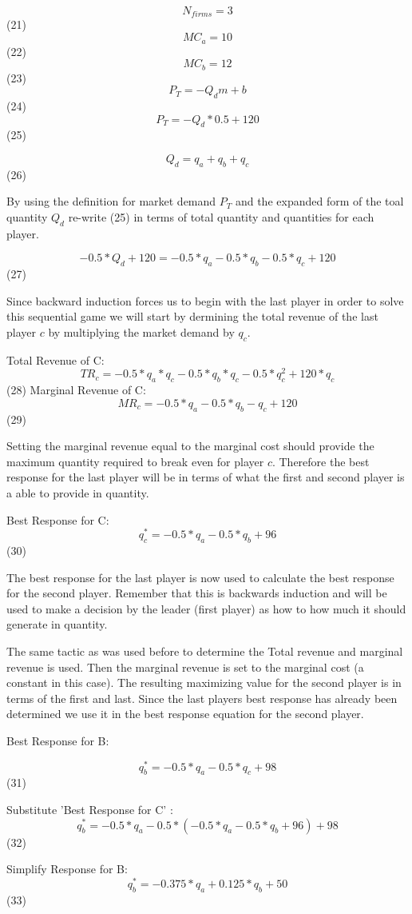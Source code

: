 \documentclass[phd, 12pt, print]{fauthesis}
\begin{document}
$$ N_{firms} = 3$$ (21)
$$ MC_{a} = 10$$ (22)
$$ MC_{b} = 12$$ (23)
$$ P_{T} = -Q_{d}m+b$$ (24)
$$ P_{T} = -Q_{d}*0.5+120$$ (25)


$$ Q_{d}= q_{a} + q_{b} + q_{c}$$(26)

By using the definition for market demand $P_{T}$ and the 
expanded form of the toal quantity $Q_{d}$ re-write (25) 
in terms of total quantity and quantities for each player.

$$ -0.5*Q_{d} + 120 = -0.5*q_{a}  - 0.5*q_{b} - 0.5*q_{c} + 120$$ (27)

Since backward induction forces us to begin with the last player
in order to solve this sequential game we will start by dermining the
total revenue of the last player $c$ by multiplying the 
market demand by $q_{c}$. 

Total Revenue of C: 
$$TR_{c} = -0.5*q_{a}*q_{c} - 0.5*q_{b}*q_{c} - 0.5*q_{c}^2 + 120*q_{c}$$ (28)
Marginal Revenue of C:
$$ MR_{c} = -0.5*q_{a} - 0.5*q_{b} -q_{c} + 120$$ (29)

Setting the marginal revenue equal to the marginal cost should provide the
maximum quantity required to break even for player $c$. Therefore the
best response for the last player will be in terms of what the
first and second player is a able to provide in quantity. 

Best Response for C:
$$ q_{c}^* = -0.5*q_{a} -0.5*q_{b} + 96$$ (30)

The best response for the last player is now used to calculate the best 
response for the second player. Remember that this is backwards induction
and will be used to make a decision by the leader (first player) as how
to how much it should generate in quantity. 

The same tactic as was used before to determine the Total revenue and marginal revenue
is used. Then the marginal revenue is set to the marginal cost (a constant in this case). 
The resulting maximizing value for the second player is in terms of the first and last. 
Since the last players best response has already been determined we use it in 
the best response equation for the second player. 

Best Response for B:

$$ q_{b}^* = -0.5*q_{a} -0.5*q_{c} + 98$$ (31)

Substitute 'Best Response for C' :
$$ q_{b}^* = -0.5*q_{a} -0.5*(-0.5*q_{a} -0.5*q_{b} + 96) + 98$$ (32)

Simplify Response for B:
$$ q_{b}^* = -0.375*q_{a} +0.125*q_{b} + 50$$ (33)
\end{document}
